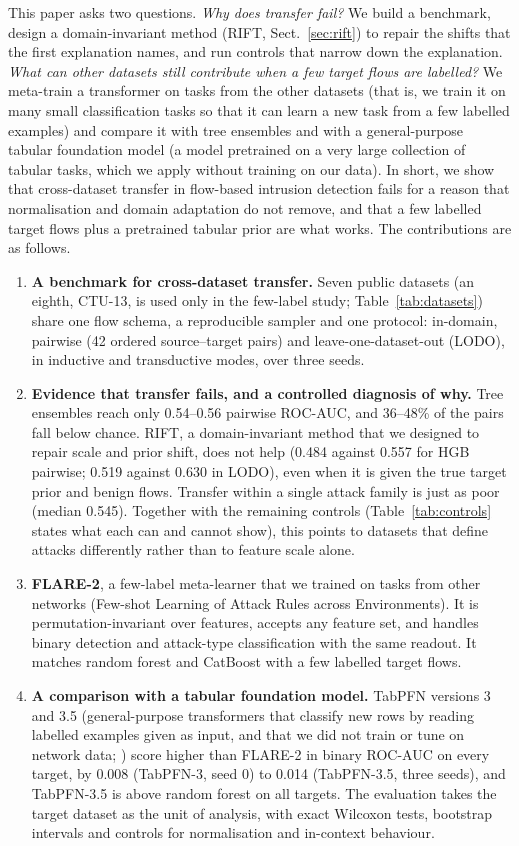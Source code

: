 \documentclass[11pt]{article}
\begin{document}
This paper asks two questions.
\emph{Why does transfer fail?} We build a benchmark, design a domain-invariant method (RIFT, Sect.~\ref{sec:rift}) to repair the shifts that the first explanation names, and run controls that narrow down the explanation.
\emph{What can other datasets still contribute when a few target flows are labelled?} We meta-train a transformer on tasks from the other datasets (that is, we train it on many small classification tasks so that it can learn a new task from a few labelled examples) and compare it with tree ensembles and with a general-purpose tabular foundation model (a model pretrained on a very large collection of tabular tasks, which we apply without training on our data).
In short, we show that cross-dataset transfer in flow-based intrusion detection fails for a reason that normalisation and domain adaptation do not remove, and that a few labelled target flows plus a pretrained tabular prior are what works.
The contributions are as follows.
\begin{enumerate}
\item \textbf{A benchmark for cross-dataset transfer.} Seven public datasets (an eighth, CTU-13, is used only in the few-label study; Table~\ref{tab:datasets}) share one flow schema, a reproducible sampler and one protocol: in-domain, pairwise (42 ordered source--target pairs) and leave-one-dataset-out (LODO), in inductive and transductive modes, over three seeds.
\item \textbf{Evidence that transfer fails, and a controlled diagnosis of why.} Tree ensembles reach only 0.54--0.56 pairwise ROC-AUC, and 36--48\% of the pairs fall below chance. RIFT, a domain-invariant method that we designed to repair scale and prior shift, does not help (0.484 against 0.557 for HGB pairwise; 0.519 against 0.630 in LODO), even when it is given the true target prior and benign flows. Transfer within a single attack family is just as poor (median 0.545). Together with the remaining controls (Table~\ref{tab:controls} states what each can and cannot show), this points to datasets that define attacks differently rather than to feature scale alone.
\item \textbf{FLARE-2}, a few-label meta-learner that we trained on tasks from other networks (Few-shot Learning of Attack Rules across Environments). It is permutation-invariant over features, accepts any feature set, and handles binary detection and attack-type classification with the same readout. It matches random forest and CatBoost with a few labelled target flows.
\item \textbf{A comparison with a tabular foundation model.} TabPFN versions 3 and 3.5 (general-purpose transformers that classify new rows by reading labelled examples given as input, and that we did not train or tune on network data; \citealt{priorlabs2026tabpfn3}) score higher than FLARE-2 in binary ROC-AUC on every target, by 0.008 (TabPFN-3, seed 0) to 0.014 (TabPFN-3.5, three seeds), and TabPFN-3.5 is above random forest on all targets. The evaluation takes the target dataset as the unit of analysis, with exact Wilcoxon tests, bootstrap intervals and controls for normalisation and in-context behaviour.
\end{enumerate}
\end{document}
